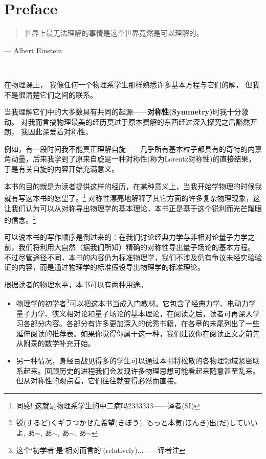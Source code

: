 
\chapter*{Preface}

\begin{quote}
世界上最无法理解的事情是这个世界竟然是可以理解的。
\end{quote}
\begin{flushright}
--- Albert Einstein
\end{flushright}


\ 

在物理课上， 我像任何一个物理系学生那样熟悉许多基本方程与它们的解， 但我不是很清楚它们之间的联系。

当我理解它们中的大多数具有共同的起源——\textbf{对称性(Symmetry)}时我十分激动。 对我而言搞物理最美的经历莫过于原本费解的东西经过深入探究之后豁然开朗， 我因此深爱着对称性。

例如，有一段时间我不能真正理解自旋——几乎所有基本粒子都具有的奇特的内禀角动量，后来我学到了原来自旋是一种对称性(称为Lorentz对称性)的直接结果，于是有关自旋的内容开始充满意义。

本书的目的就是为读者提供这样的经历，在某种意义上，当我开始学物理的时候我就有写这本书的愿望了。\footnote{同感! 这就是物理系学生的中二病吗2333333——译者(SI)} 对称性漂亮地解释了其它方面的许多复杂物理现象，这让我们认为可以从对称导出物理学的基本理论，本书正是基于这个锐利而光芒耀眼的信念。\footnote{锐(するど)くギラつかせた希望(きぼう), もっと本気(ほんき)出(だ)していいよ, あ$\sim$, あ$\sim$, あ$\sim$, あ$\sim$}

可以说本书的写作顺序是倒过来的：在我们讨论经典力学与非相对论量子力学之前，我们将利用大自然（据我们所知）精确的对称性导出量子场论的基本方程。 不过尽管途径不同，本书的内容仍为标准物理学，我们不涉及仍有争议未经实验验证的内容，而是通过物理学的标准假设导出物理学的标准理论。

根据读者的物理水平，本书可以有两种用途。
\begin{itemize}
	\item 物理学的初学者\footnote{这个`初学者'是`相对而言的'(relatively)...——译者注}可以把这本书当成入门教材。它包含了经典力学、电动力学量子力学、狭义相对论和量子场论的基本理论，在阅读之后，读者可再深入学习各部分内容。各部分有许多更加深入的优秀书籍，在各章的末尾列出了一些延伸阅读的推荐表。如果你觉得你属于这一种，我们建议你在阅读正文之前先从附录的数学补充开始。
	\item 
	另一种情况，身经百战见得多的学生可以通过本书将松散的各物理领域紧密联系起来。回顾历史的进程我们会发现许多物理思想可能看起来随意甚至乱来。但从对称性的观点看，它们往往就变得必然而直接。
\end{itemize}

